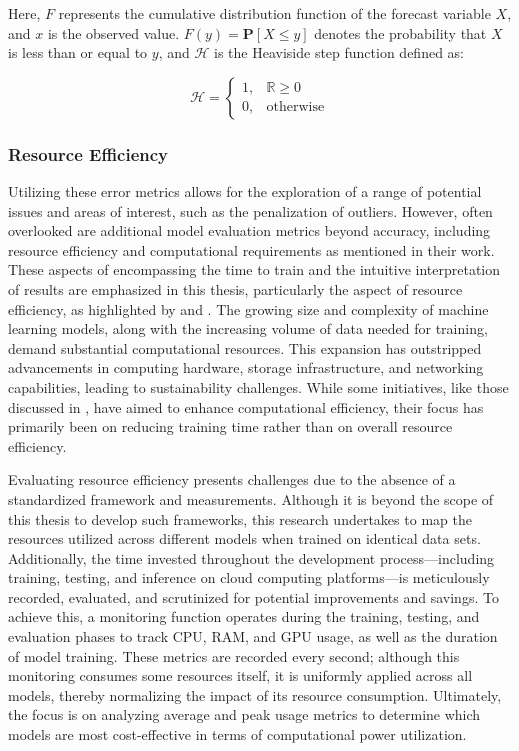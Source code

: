 \documentclass{article}
\begin{document}
Here, $F$ represents the cumulative distribution function of the forecast variable $X$, and $x$ is the observed value. $F(y) = \mathbf{P}[X \leq y]$ denotes the probability that $X$ is less than or equal to $y$, and $\mathcal{H}$ is the Heaviside step function defined as:

\begin{equation}
    \mathcal{H} = \begin{cases}
        1, & \mathbb{R} \geq 0 \\
        0, & \text{otherwise}
    \end{cases}
\end{equation}

\subsubsection{Resource Efficiency}

Utilizing these error metrics allows for the exploration of a range of potential issues and areas of interest, such as the penalization of outliers. However, often overlooked are additional model evaluation metrics beyond accuracy, including resource efficiency and computational requirements as \cite{transformers-effectiveness} mentioned in their work. These aspects of encompassing the time to train and the intuitive interpretation of results are emphasized in this thesis, particularly the aspect of resource efficiency, as highlighted by \cite{AI_energy_consumption} and \cite{resource_awareness}. The growing size and complexity of machine learning models, along with the increasing volume of data needed for training, demand substantial computational resources. This expansion has outstripped advancements in computing hardware, storage infrastructure, and networking capabilities, leading to sustainability challenges. While some initiatives, like those discussed in \cite{Informer}, have aimed to enhance computational efficiency, their focus has primarily been on reducing training time rather than on overall resource efficiency.

Evaluating resource efficiency presents challenges due to the absence of a standardized framework and measurements. Although it is beyond the scope of this thesis to develop such frameworks, this research undertakes to map the resources utilized across different models when trained on identical data sets. Additionally, the time invested throughout the development process—including training, testing, and inference on cloud computing platforms—is meticulously recorded, evaluated, and scrutinized for potential improvements and savings. To achieve this, a monitoring function operates during the training, testing, and evaluation phases to track CPU, RAM, and GPU usage, as well as the duration of model training. These metrics are recorded every second; although this monitoring consumes some resources itself, it is uniformly applied across all models, thereby normalizing the impact of its resource consumption. Ultimately, the focus is on analyzing average and peak usage metrics to determine which models are most cost-effective in terms of computational power utilization.
\end{document}
